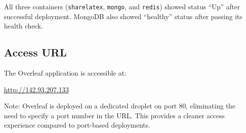 All three containers (\texttt{sharelatex}, \texttt{mongo}, and \texttt{redis}) showed status ``Up'' after successful deployment. MongoDB also showed ``healthy'' status after passing its health check.

\subsection{Access URL}
The Overleaf application is accessible at:

\url{http://142.93.207.133}

Note: Overleaf is deployed on a dedicated droplet on port 80, eliminating the need to specify a port number in the URL. This provides a cleaner access experience compared to port-based deployments.